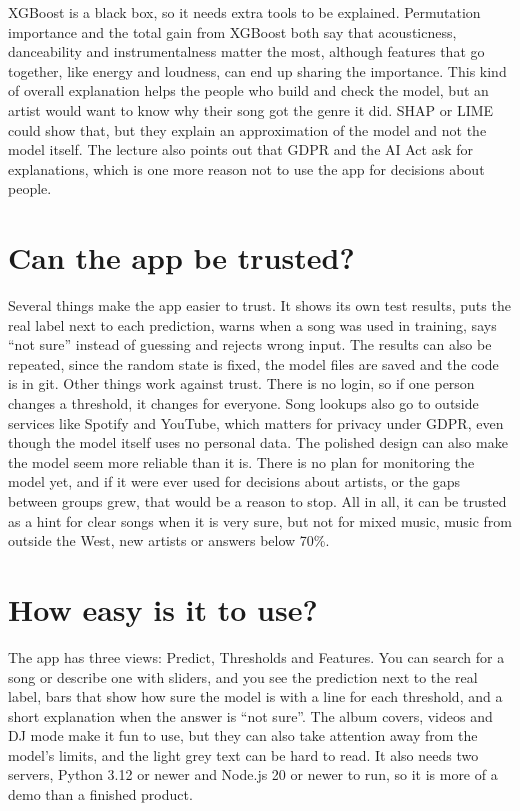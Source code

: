 \documentclass[11pt,a4paper]{article}
\begin{document}
XGBoost is a black box, so it needs extra tools to be explained. Permutation importance and the total gain from XGBoost both say that acousticness, danceability and instrumentalness matter the most, although features that go together, like energy and loudness, can end up sharing the importance. This kind of overall explanation helps the people who build and check the model, but an artist would want to know why their song got the genre it did. SHAP or LIME could show that, but they explain an approximation of the model and not the model itself. The lecture also points out that GDPR and the AI Act ask for explanations, which is one more reason not to use the app for decisions about people.

\section{Can the app be trusted?}

Several things make the app easier to trust. It shows its own test results, puts the real label next to each prediction, warns when a song was used in training, says \enquote{not sure} instead of guessing and rejects wrong input. The results can also be repeated, since the random state is fixed, the model files are saved and the code is in git. Other things work against trust. There is no login, so if one person changes a threshold, it changes for everyone. Song lookups also go to outside services like Spotify and YouTube, which matters for privacy under GDPR, even though the model itself uses no personal data. The polished design can also make the model seem more reliable than it is. There is no plan for monitoring the model yet, and if it were ever used for decisions about artists, or the gaps between groups grew, that would be a reason to stop. All in all, it can be trusted as a hint for clear songs when it is very sure, but not for mixed music, music from outside the West, new artists or answers below 70\%.

\section{How easy is it to use?}

The app has three views: Predict, Thresholds and Features. You can search for a song or describe one with sliders, and you see the prediction next to the real label, bars that show how sure the model is with a line for each threshold, and a short explanation when the answer is \enquote{not sure}. The album covers, videos and DJ mode make it fun to use, but they can also take attention away from the model's limits, and the light grey text can be hard to read. It also needs two servers, Python 3.12 or newer and Node.js 20 or newer to run, so it is more of a demo than a finished product.
\end{document}
